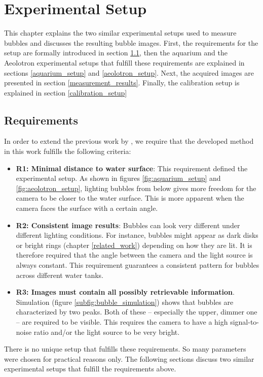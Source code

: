 \chapter{Experimental Setup}\label{experimental_setup}

	This chapter explains the two similar experimental setups used to measure bubbles and discusses the resulting bubble images. First, the requirements for the setup are formally introduced in section \ref{requirements}, then the aquarium and the Aeolotron experimental setups that fulfill these requirements are explained in sections \ref{aquarium_setup} and \ref{aeolotron_setup}. Next, the acquired images are presented in section \ref{measurement_results}. Finally, the calibration setup is explained in section \ref{calibration_setup}  
	\section{Requirements}\label{requirements}
		In order to extend the previous work by \cite{Leonie}, we require that the developed method in this work fulfills the following criteria:
	\begin{itemize}
		\item \textbf{R1: Minimal distance to water surface}: This requirement defined the experimental setup. As shown in figures \ref{fig:aquarium_setup} and \ref{fig:aeolotron_setup}, lighting bubbles from below gives more freedom for the camera to be closer to the water surface. This is more apparent when the camera faces the surface with a certain angle. 
		\item \textbf{R2: Consistent image results}: Bubbles can look very different under different lighting conditions. For instance, bubbles might appear as dark disks or bright rings (chapter \ref{related_work}) depending on how they are lit. It is therefore required that the angle between the camera and the light source is always constant. This requirement guarantees a consistent pattern for bubbles across different water tanks.
		\item \textbf{R3: Images must contain all possibly retrievable information}. Simulation (figure \ref{subfig:bubble_simulation}) shows that bubbles are characterized by two peaks. Both of these – especially the upper, dimmer one – are required to be visible. This requires the camera to have a high signal-to-noise ratio and/or the light source to be very bright. 
	\end{itemize}	
	
	There is no unique setup that fulfills these requirements. So many parameters were chosen for practical reasons only. The following sections discuss two similar experimental setups that fulfill the requirements above. 
	
